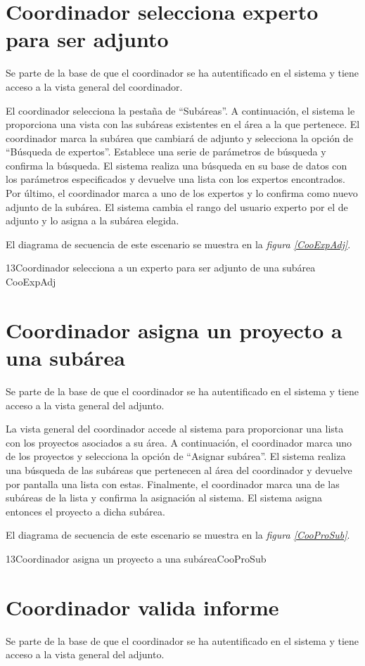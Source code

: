 \documentclass[11pt,a4paper,spanish,twoside]{book}
\begin{document}
\section{Coordinador selecciona experto para ser adjunto}
Se parte de la base de que el coordinador se ha autentificado en el sistema y
tiene acceso a la vista general del coordinador.

El coordinador selecciona la pestaña de ``Subáreas''. A continuación, el
sistema le proporciona una vista con las subáreas existentes en el área a la
que pertenece. El coordinador marca la subárea que cambiará de adjunto y
selecciona la opción de ``Búsqueda de expertos''. Establece una serie de
parámetros de búsqueda y confirma la búsqueda. El sistema realiza una búsqueda
en su base de datos con los parámetros especificados y devuelve una lista
con los expertos encontrados. Por último, el coordinador marca a uno de los
expertos y lo confirma como nuevo adjunto de la subárea. El sistema cambia
el rango del usuario experto por el de adjunto y lo asigna a la subárea
elegida.

El diagrama de secuencia de este escenario se muestra en la \emph{figura
\ref{CooExpAdj}}.

{13}{Coordinador selecciona a un experto para ser adjunto de una subárea}
{CooExpAdj}

\section{Coordinador asigna un proyecto a una subárea}
Se parte de la base de que el coordinador se ha autentificado en el sistema y
tiene acceso a la vista general del adjunto.

La vista general del coordinador accede al sistema para proporcionar una
lista con los proyectos asociados a su área. A continuación, el coordinador
marca uno de los proyectos y selecciona la opción de ``Asignar subárea''. El
sistema realiza una búsqueda de las subáreas que pertenecen al área del
coordinador y devuelve por pantalla una lista con estas. Finalmente, el
coordinador marca una de las subáreas de la lista y confirma la asignación
al sistema. El sistema asigna entonces el proyecto a dicha subárea.

El diagrama de secuencia de este escenario se muestra en la \emph{figura
\ref{CooProSub}}.

{13}{Coordinador asigna un proyecto a una subárea}{CooProSub}

\section{Coordinador valida informe}
Se parte de la base de que el coordinador se ha autentificado en el sistema y
tiene acceso a la vista general del adjunto.
\end{document}
